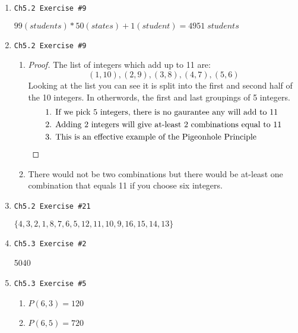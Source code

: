 \documentclass[11pt]{article}
\begin{document}
\begin{enumerate}
    \newpage
    
    \item \begin{verbatim}Ch5.2 Exercise #9\end{verbatim}
        $ 99 (students) * 50 (states) + 1 (student) = 4951 \;students $
    \item \begin{verbatim}Ch5.2 Exercise #9\end{verbatim}
        \begin{enumerate}
            \item \begin{proof}
                The list of integers which add up to 11 are: $$(1,10), (2,9), (3,8), (4,7), (5,6)$$
                Looking at the list you can see it is split into the first and second half of the 10 integers.
                In otherwords, the first and last groupings of 5 integers.
                \begin{align*}
                    & \text{1. If we pick 5 integers, there is no gaurantee any will add to 11}\\
                    & \text{2. Adding 2 integers will give at-least 2 combinations equal to 11}\\
                    & \text{3. This is an effective example of the Pigeonhole Principle} \qedhere
                \end{align*}
            \end{proof}
            \item There would not be two combinations but there would be at-least
            one combination that equals 11 if you choose six integers.
        \end{enumerate}
    \item \begin{verbatim}Ch5.2 Exercise #21\end{verbatim}
        $ \{4, 3, 2, 1, 8, 7, 6, 5, 12, 11, 10, 9, 16, 15, 14, 13\} $
    \item \begin{verbatim}Ch5.3 Exercise #2\end{verbatim}
        5040
    \item \begin{verbatim}Ch5.3 Exercise #5\end{verbatim}
        \begin{enumerate}
            \item $P(6,3) = 120$
            \item $P(6,5) = 720$

\end{enumerate}
\end{enumerate}
\end{document}
